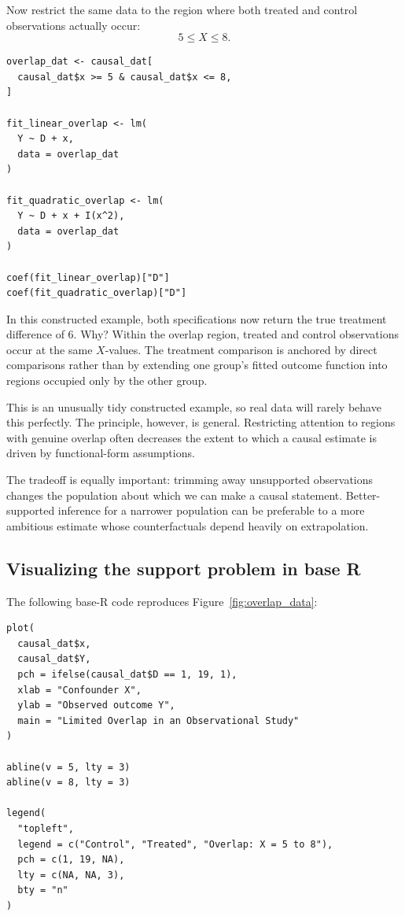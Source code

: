 \documentclass[11pt]{report}
\begin{document}
Now restrict the same data to the region where both treated and control observations actually occur:
\[
5\leq X\leq 8.
\]

\begin{lstlisting}
overlap_dat <- causal_dat[
  causal_dat$x >= 5 & causal_dat$x <= 8,
]

fit_linear_overlap <- lm(
  Y ~ D + x,
  data = overlap_dat
)

fit_quadratic_overlap <- lm(
  Y ~ D + x + I(x^2),
  data = overlap_dat
)

coef(fit_linear_overlap)["D"]
coef(fit_quadratic_overlap)["D"]
\end{lstlisting}

In this constructed example, both specifications now return the true treatment difference of 6. Why? Within the overlap region, treated and control observations occur at the same \(X\)-values. The treatment comparison is anchored by direct comparisons rather than by extending one group's fitted outcome function into regions occupied only by the other group.

This is an unusually tidy constructed example, so real data will rarely behave this perfectly. The principle, however, is general. Restricting attention to regions with genuine overlap often decreases the extent to which a causal estimate is driven by functional-form assumptions.

The tradeoff is equally important: trimming away unsupported observations changes the population about which we can make a causal statement. Better-supported inference for a narrower population can be preferable to a more ambitious estimate whose counterfactuals depend heavily on extrapolation.

\subsection{Visualizing the support problem in base R}

The following base-R code reproduces Figure~\ref{fig:overlap_data}:

\begin{lstlisting}
plot(
  causal_dat$x,
  causal_dat$Y,
  pch = ifelse(causal_dat$D == 1, 19, 1),
  xlab = "Confounder X",
  ylab = "Observed outcome Y",
  main = "Limited Overlap in an Observational Study"
)

abline(v = 5, lty = 3)
abline(v = 8, lty = 3)

legend(
  "topleft",
  legend = c("Control", "Treated", "Overlap: X = 5 to 8"),
  pch = c(1, 19, NA),
  lty = c(NA, NA, 3),
  bty = "n"
)
\end{lstlisting}
\end{document}
